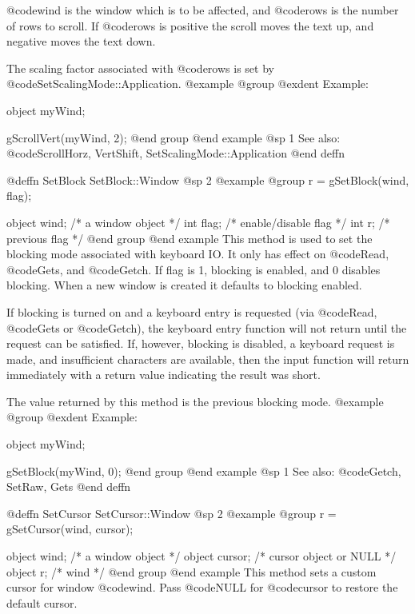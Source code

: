 @code{wind} is the window which is to be affected, and @code{rows} is the
number of rows to scroll.  If @code{rows} is positive the scroll moves
the text up, and negative moves the text down.

The scaling factor associated with @code{rows} is set by
@code{SetScalingMode::Application}.
@example
@group
@exdent Example:

object  myWind;

gScrollVert(myWind, 2);
@end group
@end example
@sp 1
See also:  @code{ScrollHorz, VertShift, SetScalingMode::Application}
@end deffn










@deffn {SetBlock} SetBlock::Window
@sp 2
@example
@group
r = gSetBlock(wind, flag);

object  wind;   /*  a window object     */
int     flag;   /*  enable/disable flag */
int     r;      /*  previous flag       */
@end group
@end example
This method is used to set the blocking mode associated with keyboard
IO.  It only has effect on @code{Read}, @code{Gets}, and @code{Getch}.
If flag is 1, blocking is enabled, and 0 disables blocking.  When a
new window is created it defaults to blocking enabled.

If blocking is turned on and a keyboard entry is requested (via
@code{Read}, @code{Gets} or @code{Getch}), the keyboard entry function
will not return until the request can be satisfied.  If, however,
blocking is disabled, a keyboard request is made, and insufficient
characters are available, then the input function will return immediately
with a return value indicating the result was short.

The value returned by this method is the previous blocking mode.
@example
@group
@exdent Example:

object  myWind;

gSetBlock(myWind, 0);
@end group
@end example
@sp 1
See also:  @code{Getch, SetRaw, Gets}
@end deffn















@deffn {SetCursor} SetCursor::Window
@sp 2
@example
@group
r = gSetCursor(wind, cursor);

object  wind;     /*  a window object      */
object  cursor;   /*  cursor object or NULL */
object  r;        /*  wind                 */
@end group
@end example
This method sets a custom cursor for window @code{wind}.
Pass @code{NULL} for @code{cursor} to restore the default cursor.

